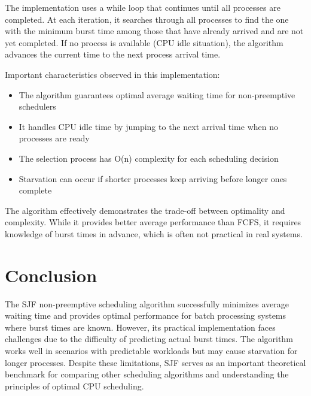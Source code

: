 \documentclass[12pt,a4paper]{article}
\begin{document}
The implementation uses a while loop that continues until all processes are completed. At each iteration, it searches through all processes to find the one with the minimum burst time among those that have already arrived and are not yet completed. If no process is available (CPU idle situation), the algorithm advances the current time to the next process arrival time.

Important characteristics observed in this implementation:
\begin{itemize}
    \item The algorithm guarantees optimal average waiting time for non-preemptive schedulers
    \item It handles CPU idle time by jumping to the next arrival time when no processes are ready
    \item The selection process has O(n) complexity for each scheduling decision
    \item Starvation can occur if shorter processes keep arriving before longer ones complete
\end{itemize}

The algorithm effectively demonstrates the trade-off between optimality and complexity. While it provides better average performance than FCFS, it requires knowledge of burst times in advance, which is often not practical in real systems.

\section{Conclusion}
The SJF non-preemptive scheduling algorithm successfully minimizes average waiting time and provides optimal performance for batch processing systems where burst times are known. However, its practical implementation faces challenges due to the difficulty of predicting actual burst times. The algorithm works well in scenarios with predictable workloads but may cause starvation for longer processes. Despite these limitations, SJF serves as an important theoretical benchmark for comparing other scheduling algorithms and understanding the principles of optimal CPU scheduling.
\end{document}
